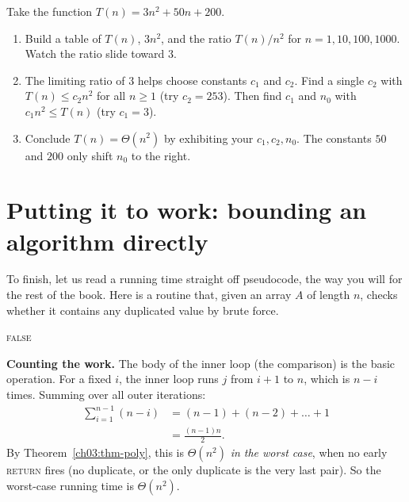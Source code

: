 \begin{labbox}
Take the function $T(n) = 3n^2 + 50n + 200$.
\begin{enumerate}
  \item Build a table of $T(n)$, $3n^2$, and the ratio $T(n)/n^2$ for
        $n = 1, 10, 100, 1000$. Watch the ratio slide toward $3$.
  \item The limiting ratio of $3$ helps choose constants $c_1$ and $c_2$. Find a single
        $c_2$ with $T(n) \le c_2 n^2$ for all $n\ge 1$ (try $c_2 = 253$). Then find $c_1$ and $n_0$ with $c_1 n^2 \le T(n)$ (try $c_1 = 3$).
  \item Conclude $T(n) = \Theta(n^2)$ by exhibiting your $c_1, c_2, n_0$. The
        constants $50$ and $200$ only shift $n_0$ to the right.
\end{enumerate}
\end{labbox}

\section{Putting it to work: bounding an algorithm directly}

To finish, let us read a running time straight off pseudocode, the way you
will for the rest of the book. Here is a routine that, given an array $A$ of length $n$,
checks whether it contains any duplicated value by brute force.

\begin{algorithm}[H]
\caption{\textsc{HasDuplicate}$(A, n)$}
\Return \textsc{false}\;
\end{algorithm}

\textbf{Counting the work.} The body of the inner loop (the comparison) is the basic
operation. For a fixed $i$, the inner loop runs $j$ from $i+1$ to $n$, which is $n - i$
times. Summing over all outer iterations:
\begin{align*}
  \sum_{i=1}^{n-1} (n - i) 
  &= (n-1) + (n-2) + \dots + 1 \\
  &= \frac{(n-1)n}{2}.
\end{align*}
By Theorem~\ref{ch03:thm-poly}, this is $\Theta(n^2)$ \emph{in the worst case}, when
no early \textsc{return} fires (no duplicate, or the only duplicate is the very last
pair). So the worst-case running time is $\Theta(n^2)$.

